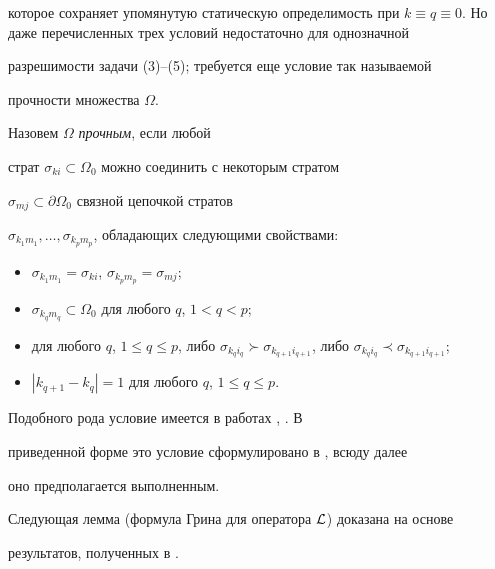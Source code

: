 которое сохраняет упомянутую статическую определимость при $k\equiv 


q\equiv0$. Но даже перечисленных трех условий недостаточно для однозначной 


разрешимости задачи (3)--(5); требуется еще условие так называемой 


прочности множества $\Omega$.





Назовем $\Omega$ {\it прочным}, если любой 


страт $\sigma_{ki}\subset\Omega_0$ можно соединить с некоторым стратом 


$\sigma_{mj}\subset\partial\Omega_0$ связной цепочкой стратов 


$\sigma_{k_1m_1},\dotsc,\sigma_{k_p m_p}$, обладающих следующими свойствами: 


\begin{itemize} 


\item[] $\sigma_{k_1m_1}=\sigma_{ki}$, $\sigma_{k_p m_p}=\sigma_{mj}$; 


\item[] $\sigma_{k_q m_q}\subset\Omega_0$ для любого $q$, $1<q<p$; 


\item[] для любого $q$, $1\le q\le p$, либо $\sigma_{k_q 


i_q}\succ\sigma_{k_{q+1}i_{q+1}}$, либо $\sigma_{k_q i_q}\prec 


\sigma_{k_{q+1}i_{q+1}}$; 


\item[] $|k_{q+1}-k_q|=1$ для любого $q$, $1\le q\le p$. 


\end{itemize} 


Подобного рода условие имеется в работах \cite{5}, \cite{6}. В 


приведенной форме это условие сформулировано в \cite{13}, всюду далее 


оно предполагается выполненным. 


 


Следующая лемма (формула Грина для оператора $\cal L$) доказана на основе 


результатов, полученных в \cite{14}. 


 


